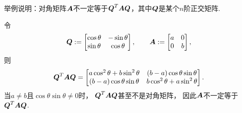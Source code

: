 \begin{example}
举例说明：对角矩阵\(\boldsymbol{A}\)不一定等于\(\boldsymbol{Q}^T \boldsymbol{A} \boldsymbol{Q}\)，其中\(\boldsymbol{Q}\)是某个\(n\)阶正交矩阵.
\begin{solution}
令\begin{equation*}
	\boldsymbol{Q} := \begin{bmatrix}
		\cos\theta & -\sin\theta \\
		\sin\theta & \cos\theta
	\end{bmatrix},
	\qquad
	\boldsymbol{A} := \begin{bmatrix}
		a & 0 \\
		0 & b
	\end{bmatrix},
\end{equation*}
则\begin{equation*}
	\boldsymbol{Q}^T \boldsymbol{A} \boldsymbol{Q}
	= \begin{bmatrix}
		a \cos^2\theta + b \sin^2\theta & (b-a) \cos\theta \sin\theta \\
		(b-a) \cos\theta \sin\theta & b \cos^2\theta + a \sin^2\theta
	\end{bmatrix}.
\end{equation*}
当\(a \neq b\)且\(\cos\theta \sin\theta \neq 0\)时，
\(\boldsymbol{Q}^T \boldsymbol{A} \boldsymbol{Q}\)甚至不是对角矩阵，
因此\(\boldsymbol{A}\)不一定等于\(\boldsymbol{Q}^T \boldsymbol{A} \boldsymbol{Q}\).
\end{solution}
\end{example}

